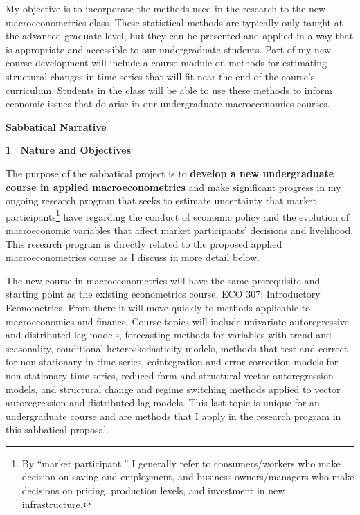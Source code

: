\documentclass[11pt]{article}
\begin{document}
My objective is to incorporate the methods used in the research to the new macroeconometrics class.  These statistical methods are typically only taught at the advanced graduate level, but they can be presented and applied in a way that is appropriate and accessible to our undergraduate students.  Part of my new course development will include a course module on methods for estimating structural changes in time series that will fit near the end of the course's curriculum.  Students in the class will be able to use these methods to inform economic issues that do arise in our undergraduate macroeconomics courses.

\newpage

\begin{center}\textbf{Sabbatical Narrative}\end{center}

\noindent \textbf{1~ Nature and Objectives} 

\noindent The purpose of the sabbatical project is to \textbf{develop a new undergraduate course in applied macroeconometrics} and make significant progress in my ongoing research program that seeks to estimate uncertainty that market participants\footnote{By ``market participant,'' I generally refer to consumers/workers who make decision on saving and employment, and business owners/managers who make decisions on pricing, production levels, and investment in new infrastructure.} have regarding the conduct of economic policy and the evolution of macroeconomic variables that affect market participants' decisions and livelihood.  This research program is directly related to the proposed applied macroeconometrics course as I discuss in more detail below.

The new course in macroeconometrics will have the same prerequisite and starting point as the existing econometrics course, ECO 307: Introductory Econometrics.  From there it will move quickly to methods applicable to macroeconomics and finance.  Course topics will include univariate autoregressive and distributed lag models, forecasting methods for variables with trend and seasonality, conditional heteroskedasticity models, methods that test and correct for non-stationary in time series, cointegration and error correction models for non-stationary time series, reduced form and structural vector autoregression models, and structural change and regime switching methods applied to vector autoregression and distributed lag models.  This last topic is unique for an undergraduate course and are methods that I apply in the research program in this sabbatical proposal.
\end{document}
